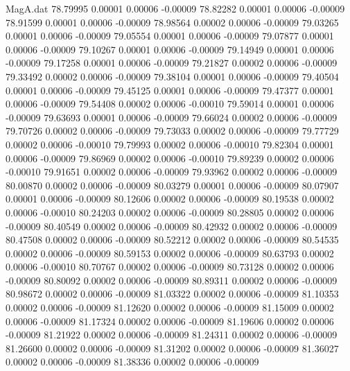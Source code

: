\begin{filecontents}{MagA.dat}
  78.79995    0.00001    0.00006   -0.00009
  78.82282    0.00001    0.00006   -0.00009
  78.91599    0.00001    0.00006   -0.00009
  78.98564    0.00002    0.00006   -0.00009
  79.03265    0.00001    0.00006   -0.00009
  79.05554    0.00001    0.00006   -0.00009
  79.07877    0.00001    0.00006   -0.00009
  79.10267    0.00001    0.00006   -0.00009
  79.14949    0.00001    0.00006   -0.00009
  79.17258    0.00001    0.00006   -0.00009
  79.21827    0.00002    0.00006   -0.00009
  79.33492    0.00002    0.00006   -0.00009
  79.38104    0.00001    0.00006   -0.00009
  79.40504    0.00001    0.00006   -0.00009
  79.45125    0.00001    0.00006   -0.00009
  79.47377    0.00001    0.00006   -0.00009
  79.54408    0.00002    0.00006   -0.00010
  79.59014    0.00001    0.00006   -0.00009
  79.63693    0.00001    0.00006   -0.00009
  79.66024    0.00002    0.00006   -0.00009
  79.70726    0.00002    0.00006   -0.00009
  79.73033    0.00002    0.00006   -0.00009
  79.77729    0.00002    0.00006   -0.00010
  79.79993    0.00002    0.00006   -0.00010
  79.82304    0.00001    0.00006   -0.00009
  79.86969    0.00002    0.00006   -0.00010
  79.89239    0.00002    0.00006   -0.00010
  79.91651    0.00002    0.00006   -0.00009
  79.93962    0.00002    0.00006   -0.00009
  80.00870    0.00002    0.00006   -0.00009
  80.03279    0.00001    0.00006   -0.00009
  80.07907    0.00001    0.00006   -0.00009
  80.12606    0.00002    0.00006   -0.00009
  80.19538    0.00002    0.00006   -0.00010
  80.24203    0.00002    0.00006   -0.00009
  80.28805    0.00002    0.00006   -0.00009
  80.40549    0.00002    0.00006   -0.00009
  80.42932    0.00002    0.00006   -0.00009
  80.47508    0.00002    0.00006   -0.00009
  80.52212    0.00002    0.00006   -0.00009
  80.54535    0.00002    0.00006   -0.00009
  80.59153    0.00002    0.00006   -0.00009
  80.63793    0.00002    0.00006   -0.00010
  80.70767    0.00002    0.00006   -0.00009
  80.73128    0.00002    0.00006   -0.00009
  80.80092    0.00002    0.00006   -0.00009
  80.89311    0.00002    0.00006   -0.00009
  80.98672    0.00002    0.00006   -0.00009
  81.03322    0.00002    0.00006   -0.00009
  81.10353    0.00002    0.00006   -0.00009
  81.12620    0.00002    0.00006   -0.00009
  81.15009    0.00002    0.00006   -0.00009
  81.17324    0.00002    0.00006   -0.00009
  81.19606    0.00002    0.00006   -0.00009
  81.21922    0.00002    0.00006   -0.00009
  81.24311    0.00002    0.00006   -0.00009
  81.26600    0.00002    0.00006   -0.00009
  81.31202    0.00002    0.00006   -0.00009
  81.36027    0.00002    0.00006   -0.00009
  81.38336    0.00002    0.00006   -0.00009

\end{filecontents}
